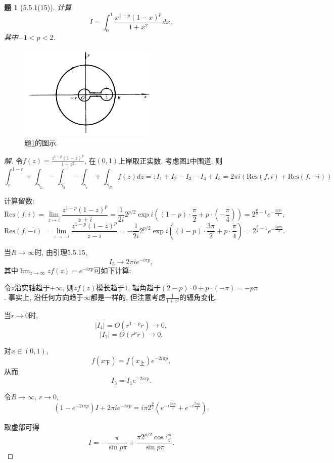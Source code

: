 \documentclass{article}[a4paper, 12pt]
\theoremstyle{mystyle}
\newtheorem{problem}{题}
\newenvironment{solution}{\begin{proof}[解]}{\end{proof}}
\begin{document}
\begin{problem}[5.5.1(15)]\label{15}
  计算\[I=\int_0^1 \frac{x^{1-p}(1-x)^p}{1+x^2}dx,\] 其中\(-1<p<2\).
\end{problem}

\begin{figure}[htbp]
  \centering
  \includegraphics[width=0.6\textwidth]{images/15.png}
  \caption{题\ref{15}的图示.}
  \label{fig:15}
\end{figure}

\begin{solution}
  令\(f(z)=\frac{z^{1-p}(1-z)^p}{1+z^2}\), 在\((0,1)\)上岸取正实数. 考虑图\ref{fig:15}中围道. 则\[\int_{r}^{1-r}+\int_{\gamma_2}-\int_{\gamma_3}-\int_{\gamma_r}+\int_{\gamma_R} f(z)dz=:I_1+I_2-I_3-I_4+I_5=2\pi i\left(\text{Res}(f,i)+\text{Res}(f,-i)\right)\]

  计算留数: \[\text{Res}(f,i)=\lim_{z\to i}\frac{z^{1-p}(1-z)^p}{z+i}=\frac{1}{2i}2^{p/2}\exp i\left((1-p)\cdot\frac{\pi}{2}+p\cdot(-\frac{\pi}{4})\right)=2^{\frac{p}{2}-1}e^{-\frac{3p\pi i}{4}},\] \[\text{Res}(f,-i)=\lim_{z\to -i}\frac{z^{1-p}(1-z)^p}{z-i}=-\frac{1}{2i}2^{p/2}\exp i\left((1-p)\cdot\frac{3\pi}{2}+p\cdot\frac{\pi}{4}\right)=2^{\frac{p}{2}-1}e^{-\frac{5p\pi i}{4}}.\]

  当\(R\to\infty\)时, 由引理5.5.15, \[I_5\to2\pi i e^{-i\pi p},\] 其中\(\lim_{z\to\infty} zf(z)=e^{-i\pi p}\)可如下计算:

  令\(z\)沿实轴趋于\(+\infty\), 则\(zf(z)\)模长趋于\(1\), 辐角趋于\((2-p)\cdot0+p\cdot(-\pi)=-p\pi\). 事实上, 沿任何方向趋于\(\infty\)都是一样的, 但注意考虑\(\frac{1}{1+z^2}\)的辐角变化.

  当\(r\to0\)时, \[|I_4|=O(r^{1-p}r)\to 0,\] \[|I_2|=O(r^p r)\to0.\]

  对\(x\in(0,1)\), \[f(x_{\text{下}})=f(x_{\text{上}})e^{-2i\pi p},\] 从而\[I_3=I_1e^{-2i \pi p}.\]

  令\(R\to\infty\), \(r\to 0\), \[(1-e^{-2i\pi p})I+2\pi ie^{-i\pi p}=i\pi 2^{\frac{p}{2}}\left(e^{-i\frac{3\pi p}{4}}+e^{-i\frac{5\pi p}{4}}\right).\]

  取虚部可得\[I=-\frac{\pi}{\sin p\pi}+\frac{\pi 2^{p/2}\cos \frac{p\pi}{4}}{\sin p\pi}. \tag*{\(\qed\)}\]
  \renewcommand{\qedsymbol}{}
\end{solution}
\end{document}
